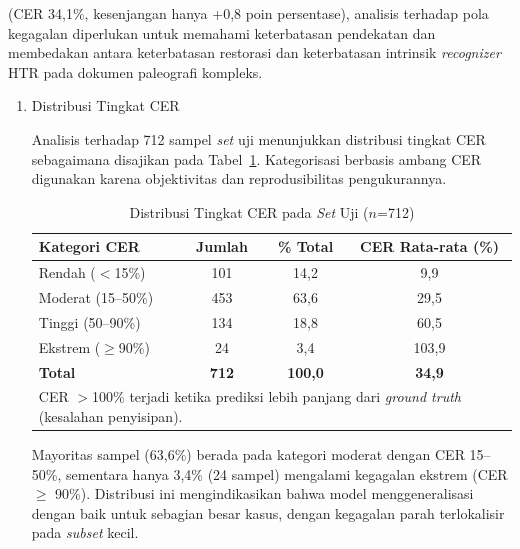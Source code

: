 (CER 34,1\%, kesenjangan hanya +0,8 poin persentase), analisis terhadap pola kegagalan diperlukan untuk memahami keterbatasan pendekatan dan membedakan antara keterbatasan restorasi dan keterbatasan intrinsik \textit{recognizer} HTR pada dokumen paleografi kompleks.
\begin{enumerate}[leftmargin=1.5em, labelsep=0.5em, itemindent=0pt, label=\arabic*., topsep=0pt, partopsep=0pt]
\item Distribusi Tingkat CER

Analisis terhadap 712 sampel \textit{set} uji menunjukkan distribusi tingkat CER sebagaimana disajikan pada Tabel~\ref{table:cer-distribution}. Kategorisasi berbasis ambang CER digunakan karena objektivitas dan reprodusibilitas pengukurannya.

\begin{table}[!htbp]
    \renewcommand{\arraystretch}{1.15}
    \caption[Distribusi Tingkat CER]{Distribusi Tingkat CER pada \textit{Set} Uji ($n$=712)}
    \label{table:cer-distribution}
    \small
    \begin{tabular}{|l|c|c|c|}
        \hline
        \textbf{Kategori CER}            & \textbf{Jumlah} & \textbf{\% Total} & \textbf{CER Rata-rata (\%)}  \\
        \hline
        Rendah ($<$15\%)        & 101    & 14,2     & 9,9                 \\
        Moderat (15--50\%)      & 453    & 63,6     & 29,5                \\
        Tinggi (50--90\%)       & 134    & 18,8     & 60,5                \\
        Ekstrem ($\geq$90\%)    & 24     & 3,4      & 103,9               \\
        \hline
        \textbf{Total}          & \textbf{712} & \textbf{100,0} & \textbf{34,9} \\
        \hline
        \multicolumn{4}{l}{\footnotesize CER $>$100\% terjadi ketika prediksi lebih panjang dari \textit{ground truth} (kesalahan penyisipan).} \\
    \end{tabular}
\end{table}

Mayoritas sampel (63,6\%) berada pada kategori moderat dengan CER 15--50\%, sementara hanya 3,4\% (24 sampel) mengalami kegagalan ekstrem (CER $\geq$ 90\%). Distribusi ini mengindikasikan bahwa model menggeneralisasi dengan baik untuk sebagian besar kasus, dengan kegagalan parah terlokalisir pada \textit{subset} kecil.


\end{enumerate}
